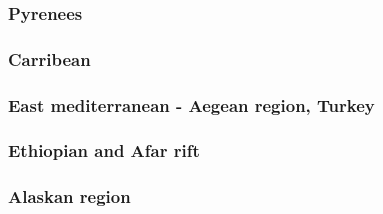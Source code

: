 \cite{bird78}
\cite{moln89}
\cite{moem93}
\cite{wibe94}
\cite{chmm95}
\cite{robk97}
\cite{vasb99}
\cite{cblk00}\cite{clro00}
\cite{bejn01}\cite{laav01}\cite{zemk01}\cite{tzrm01}
\cite{kozc02}
\cite{reta03}
\cite{bejn04}
\cite{clbr05}\cite{rost05a}\cite{rost05b}
\cite{clrw06}
\cite{busc08}
\cite{hamo10}
\cite{care13}\cite{mutg13}\cite{chgz13}\cite{chgz13b}
\cite{whbb14}
\cite{bube17}
\cite{pirf18}
\cite{sccs19}

\subsubsection*{Pyrenees} 

\cite{giju98}
\cite{bemh00}
\cite{mcmg04}
\cite{jaml10}
\cite{fihv13b}
\cite{dual19}

\subsubsection*{Carribean} 

\subsubsection*{East mediterranean - Aegean region, Turkey} 

\cite{cazf10}

\subsubsection*{Ethiopian and Afar rift} 

\cite{mitk07}
\cite{cort08}
\cite{kekj09}
\cite{beve10}
\cite{phcs14}
\cite{brcr17}
\cite{brcg17}
\cite{cocf19}

\subsubsection*{Alaskan region} 

